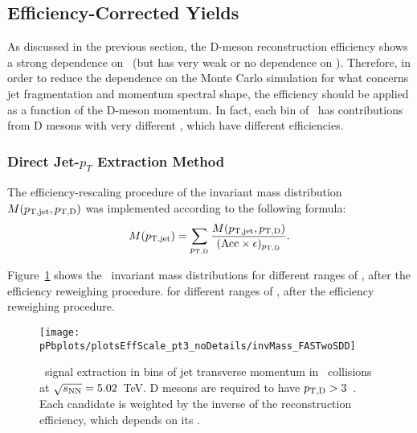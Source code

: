 
\subsection{Efficiency-Corrected Yields}

As discussed in the previous section, the D-meson reconstruction efficiency shows a strong dependence on \ptd\ (but has very weak or no dependence on \ptjet).
Therefore, in order to reduce the dependence on the Monte Carlo simulation for what concerns jet fragmentation and momentum spectral shape,
the efficiency should be applied as a function of the D-meson momentum. In fact, each bin of \ptjet\ has contributions from D mesons with very different \ptd, which have different efficiencies.

\subsubsection{Direct Jet-$p_T$ Extraction Method}

The efficiency-rescaling procedure of the invariant mass distribution $M(p_{\mathrm{T,jet}},p_{\mathrm{T,D}})$ was implemented according to the following formula:
\begin{equation}
M(p_{\mathrm{T,jet}}) = \displaystyle\sum_{p_{\mathrm{T,D}}}\frac{M(p_{\mathrm{T,jet}},p_{\mathrm{T,D}})}{({\rm Acc} \times \epsilon)_{p_{\mathrm{T,D}}}}.
\end{equation}

Figure~\ref{fig:eq_pPb_Directjet_corrInv_Dstar} shows the \Dstar\ invariant mass distributions for different ranges of \ptchjet, after the efficiency reweighing procedure.
for different ranges of \ptchjet, after the efficiency reweighing procedure.

\begin{figure}[bth]
\centering
\texttt{[image: pPbplots/plotsEffScale\_pt3\_noDetails/invMass\_FASTwoSDD]}
\caption{\Dstar\ signal extraction in bins of jet transverse momentum in \pPb\ collisions at $\sqrt{s_{\rm NN}}=5.02$~TeV. D mesons are required to have $p_{\mathrm{T,D}}>3$~\GeVc.
Each candidate is weighted by the inverse of the reconstruction efficiency, which depends on its \ptd.}
\label{fig:eq_pPb_Directjet_corrInv_Dstar}
\end{figure}

